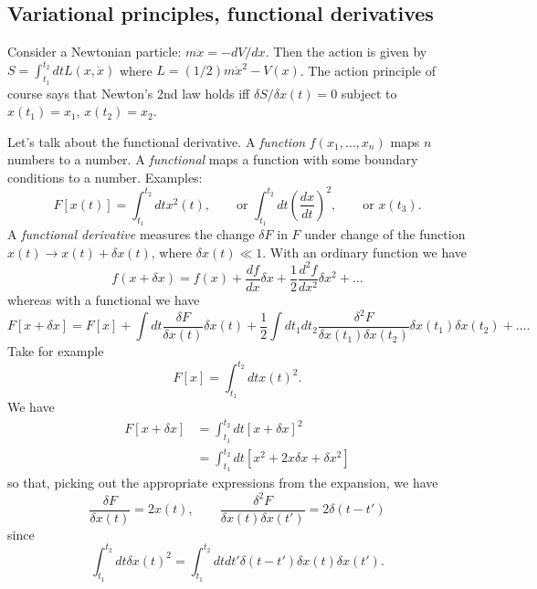 \documentclass[12pt]{article} %
\begin{document}
\subsection{Variational principles, functional derivatives}

Consider a Newtonian particle: $m\ddot{x} = -dV/dx$. Then the action is given by $S = \int_{t_1}^{t_2} dt L(x, \dot{x})$ where $L = (1/2)m\dot{x}^2 - V(x)$. The action principle of course says that Newton's 2nd law holds iff $\delta S / \delta x(t) = 0$ subject to $x(t_1) = x_1$, $x(t_2) = x_2$. 

Let's talk about the functional derivative. A \textit{function} $f(x_1, \dots, x_n)$ maps $n$ numbers to a number. A \textit{functional} maps a function with some boundary conditions to a number. Examples:
\begin{equation}
F[x(t)] = \int_{t_1}^{t_2} dt x^2(t), \qquad \text{or } \int_{t_1}^{t_2} dt (\frac{dx}{dt})^2, \qquad \text{or } x(t_3).
\end{equation}
A \textit{functional derivative} measures the change $\delta F$ in $F$ under change of the function $x(t) \rightarrow x(t) + \delta x(t)$, where $\delta x(t) \ll 1$. With an ordinary function we have
\begin{equation}
f(x+\delta x) = f(x) + \frac{df}{dx} \delta x + \frac{1}{2} \frac{d^2 f}{dx^2} \delta x^2 + \dots
\end{equation}
whereas with a functional we have 
\begin{equation}
F[x+\delta x] = F[x] + \int dt \frac{\delta F}{\delta x(t)} \delta x(t) + \frac{1}{2} \int dt_1 dt_2 \frac{\delta^2 F}{\delta x(t_1) \delta x(t_2)} \delta x(t_1) \delta x(t_2) + \dots.
\end{equation}
Take for example 
\begin{equation}
F[x] = \int_{t_1}^{t_2} dt x(t)^2.
\end{equation}
We have
\begin{align}
F[x+\delta x] &= \int_{t_1}^{t_2} dt [x+\delta x]^2 \\
	&= \int_{t_1}^{t_2} dt [x^2 + 2x \delta x + \delta x^2]
\end{align}
so that, picking out the appropriate expressions from the expansion, we have
\begin{equation}
\frac{\delta F}{\delta x(t)} = 2x(t), \qquad \frac{\delta^2 F}{\delta x(t) \delta x(t')} = 2\delta(t-t')
\end{equation}
since
\begin{equation}
\int_{t_1}^{t_2} dt \delta x(t)^2 = \int_{t_1}^{t_2} dt dt' \delta(t-t') \delta x(t) \delta x(t').
\end{equation}
\end{document}
